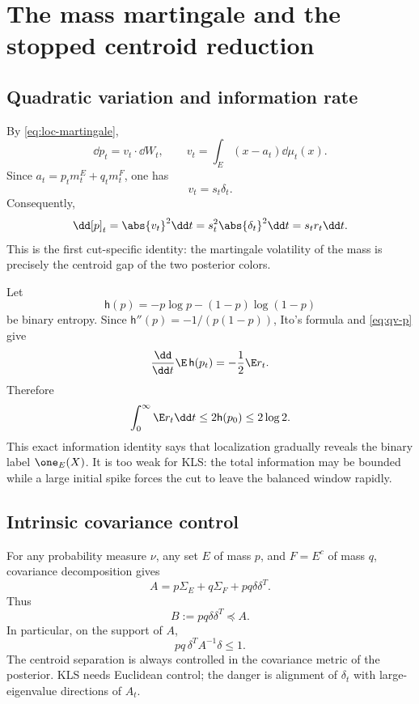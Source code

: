 \documentclass[../../main.tex]{subfiles}
\begin{document}
\section{The mass martingale and the stopped centroid reduction}
\label{sec:mass-martingale}

\subsection{Quadratic variation and information rate}

By \eqref{eq:loc-martingale},
\[
  \dd p_t=v_t\cdot\dd W_t,
  \qquad
  v_t=\int_E(x-a_t)\dd\mu_t(x).
\]
Since $a_t=p_tm_t^E+q_tm_t^F$, one has
\begin{equation}\label{eq:v-s-delta}
  v_t=s_t\delta_t .
\end{equation}
Consequently,
\begin{equation}\label{eq:qv-p}
  \dd[p]_t=\abs{v_t}^2\dd t=s_t^2\abs{\delta_t}^2\dd t=s_tr_t\dd t.
\end{equation}
This is the first cut-specific identity: the martingale volatility of the mass is precisely the
centroid gap of the two posterior colors.

Let
\[
  \mathsf h(p)=-p\log p-(1-p)\log(1-p)
\]
be binary entropy. Since $\mathsf h''(p)=-1/(p(1-p))$, Ito's formula and \eqref{eq:qv-p} give
\begin{equation}\label{eq:entropy-rate}
  \frac{\dd}{\dd t}\E\,\mathsf h(p_t)=-\frac12\E r_t .
\end{equation}
Therefore
\begin{equation}\label{eq:total-info}
  \int_0^\infty \E r_t\dd t\le2\mathsf h(p_0)\le2\log2 .
\end{equation}
This exact information identity says that localization gradually reveals the binary label
$\one_E(X)$. It is too weak for KLS: the total information may be bounded while a large initial
spike forces the cut to leave the balanced window rapidly.

\subsection{Intrinsic covariance control}

For any probability measure $\nu$, any set $E$ of mass $p$, and $F=E^c$ of mass $q$, covariance
decomposition gives
\begin{equation}\label{eq:cov-decomp}
  A=p\Sigma_E+q\Sigma_F+pq\delta\delta^T.
\end{equation}
Thus
\begin{equation}\label{eq:B-le-A}
  B:=pq\delta\delta^T\preceq A.
\end{equation}
In particular, on the support of $A$,
\begin{equation}\label{eq:intrinsic-bound}
  pq\,\delta^TA^{-1}\delta\le1.
\end{equation}
The centroid separation is always controlled in the covariance metric of the posterior. KLS needs
Euclidean control; the danger is alignment of $\delta_t$ with large-eigenvalue directions of $A_t$.
\end{document}
